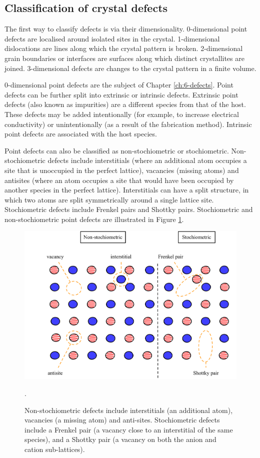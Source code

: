 \subsection{Classification of crystal defects}

The first way to classify defects is via their dimensionality. 0-dimensional point defects are localised around isolated sites in the crystal. 1-dimensional dislocations are lines along which the crystal pattern is broken. 2-dimensional grain boundaries or interfaces are surfaces along which distinct crystallites are joined. 3-dimensional defects are changes to the crystal pattern in a finite volume. 

0-dimensional point defects are the subject of Chapter \ref{ch:6-defects}. Point defects can be further split into extrinsic or intrinsic defects. Extrinsic point defects (also known as impurities) are a different species from that of the host. These defects may be added intentionally (for example, to increase electrical conductivity) or unintentionally (as a result of the fabrication method). Intrinsic point defects are associated with the host species.

Point defects can also be classified as non-stochiometric or stochiometric. Non-stochiometric defects include interstitials (where an additional atom occupies a site that is unoccupied in the perfect lattice), vacancies (missing atoms) and antisites (where an atom occupies a site that would have been occupied by another species in the perfect lattice). Interstitials can have a split structure, in which two atoms are split symmetrically around a single lattice site. Stochiometric defects include Frenkel pairs and Shottky pairs. Stochiometric and non-stochiometric point defects are illustrated in Figure \ref{classification}.

\begin{figure}[h]
\centering
  \includegraphics[width=0.8\columnwidth]{figures/ch3/classification.png}
  \caption[Classification of crystal point-defects]{Non-stochiometric defects include interstitials (an additional atom), vacancies (a missing atom) and anti-sites. Stochiometric defects include a Frenkel pair (a vacancy close to an interstitial of the same species), and a Shottky pair (a vacancy on both the anion and cation sub-lattices).}
  \label{classification} . %
\end{figure}

